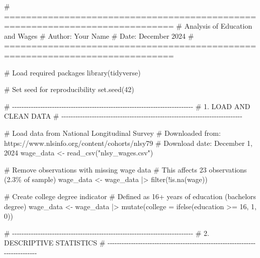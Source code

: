 \documentclass[
  letterpaper,
  DIV=11,
  numbers=noendperiod]{scrreprt}
\newenvironment{Shaded}{\begin{snugshade}}{\end{snugshade}}
\newcommand{\AttributeTok}[1]{\textcolor[rgb]{0.40,0.45,0.13}{#1}}
\newcommand{\CommentTok}[1]{\textcolor[rgb]{0.37,0.37,0.37}{#1}}
\newcommand{\DecValTok}[1]{\textcolor[rgb]{0.68,0.00,0.00}{#1}}
\newcommand{\FunctionTok}[1]{\textcolor[rgb]{0.28,0.35,0.67}{#1}}
\newcommand{\NormalTok}[1]{\textcolor[rgb]{0.00,0.23,0.31}{#1}}
\newcommand{\OtherTok}[1]{\textcolor[rgb]{0.00,0.23,0.31}{#1}}
\newcommand{\SpecialCharTok}[1]{\textcolor[rgb]{0.37,0.37,0.37}{#1}}
\newcommand{\StringTok}[1]{\textcolor[rgb]{0.13,0.47,0.30}{#1}}
\begin{document}
\begin{Shaded}
\begin{Highlighting}[]
\CommentTok{\# =============================================================================}
\CommentTok{\# Analysis of Education and Wages}
\CommentTok{\# Author: Your Name}
\CommentTok{\# Date: December 2024}
\CommentTok{\# =============================================================================}

\CommentTok{\# Load required packages}
\FunctionTok{library}\NormalTok{(tidyverse)}

\CommentTok{\# Set seed for reproducibility}
\FunctionTok{set.seed}\NormalTok{(}\DecValTok{42}\NormalTok{)}

\CommentTok{\# {-}{-}{-}{-}{-}{-}{-}{-}{-}{-}{-}{-}{-}{-}{-}{-}{-}{-}{-}{-}{-}{-}{-}{-}{-}{-}{-}{-}{-}{-}{-}{-}{-}{-}{-}{-}{-}{-}{-}{-}{-}{-}{-}{-}{-}{-}{-}{-}{-}{-}{-}{-}{-}{-}{-}{-}{-}{-}{-}{-}{-}{-}{-}{-}{-}{-}{-}{-}{-}{-}{-}{-}{-}{-}{-}{-}{-}}
\CommentTok{\# 1. LOAD AND CLEAN DATA}
\CommentTok{\# {-}{-}{-}{-}{-}{-}{-}{-}{-}{-}{-}{-}{-}{-}{-}{-}{-}{-}{-}{-}{-}{-}{-}{-}{-}{-}{-}{-}{-}{-}{-}{-}{-}{-}{-}{-}{-}{-}{-}{-}{-}{-}{-}{-}{-}{-}{-}{-}{-}{-}{-}{-}{-}{-}{-}{-}{-}{-}{-}{-}{-}{-}{-}{-}{-}{-}{-}{-}{-}{-}{-}{-}{-}{-}{-}{-}{-}}

\CommentTok{\# Load data from National Longitudinal Survey}
\CommentTok{\# Downloaded from: https://www.nlsinfo.org/content/cohorts/nlsy79}
\CommentTok{\# Download date: December 1, 2024}
\NormalTok{wage\_data }\OtherTok{\textless{}{-}} \FunctionTok{read\_csv}\NormalTok{(}\StringTok{"nlsy\_wages.csv"}\NormalTok{)}

\CommentTok{\# Remove observations with missing wage data}
\CommentTok{\# This affects 23 observations (2.3\% of sample)}
\NormalTok{wage\_data }\OtherTok{\textless{}{-}}\NormalTok{ wage\_data }\SpecialCharTok{|\textgreater{}}
  \FunctionTok{filter}\NormalTok{(}\SpecialCharTok{!}\FunctionTok{is.na}\NormalTok{(wage))}

\CommentTok{\# Create college degree indicator}
\CommentTok{\# Defined as 16+ years of education (bachelor\textquotesingle{}s degree)}
\NormalTok{wage\_data }\OtherTok{\textless{}{-}}\NormalTok{ wage\_data }\SpecialCharTok{|\textgreater{}}
  \FunctionTok{mutate}\NormalTok{(}\AttributeTok{college =} \FunctionTok{ifelse}\NormalTok{(education }\SpecialCharTok{\textgreater{}=} \DecValTok{16}\NormalTok{, }\DecValTok{1}\NormalTok{, }\DecValTok{0}\NormalTok{))}

\CommentTok{\# {-}{-}{-}{-}{-}{-}{-}{-}{-}{-}{-}{-}{-}{-}{-}{-}{-}{-}{-}{-}{-}{-}{-}{-}{-}{-}{-}{-}{-}{-}{-}{-}{-}{-}{-}{-}{-}{-}{-}{-}{-}{-}{-}{-}{-}{-}{-}{-}{-}{-}{-}{-}{-}{-}{-}{-}{-}{-}{-}{-}{-}{-}{-}{-}{-}{-}{-}{-}{-}{-}{-}{-}{-}{-}{-}{-}{-}}
\CommentTok{\# 2. DESCRIPTIVE STATISTICS}
\CommentTok{\# {-}{-}{-}{-}{-}{-}{-}{-}{-}{-}{-}{-}{-}{-}{-}{-}{-}{-}{-}{-}{-}{-}{-}{-}{-}{-}{-}{-}{-}{-}{-}{-}{-}{-}{-}{-}{-}{-}{-}{-}{-}{-}{-}{-}{-}{-}{-}{-}{-}{-}{-}{-}{-}{-}{-}{-}{-}{-}{-}{-}{-}{-}{-}{-}{-}{-}{-}{-}{-}{-}{-}{-}{-}{-}{-}{-}{-}}


\end{Highlighting}
\end{Shaded}
\end{document}
